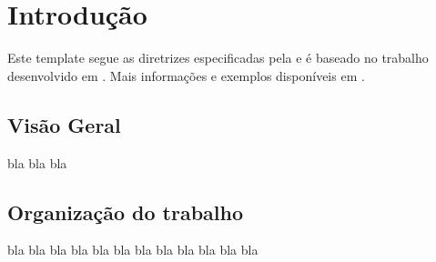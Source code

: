 \chapter[Introdução]{Introdução}
Este template segue as diretrizes especificadas pela  e é baseado no trabalho desenvolvido em \cite{manual_abntex2}. Mais informações e exemplos disponíveis em \cite{site_abntex2}.

\section{Visão Geral}
bla bla bla

\section{Organização do trabalho}
bla bla bla bla bla bla bla bla bla bla bla bla
